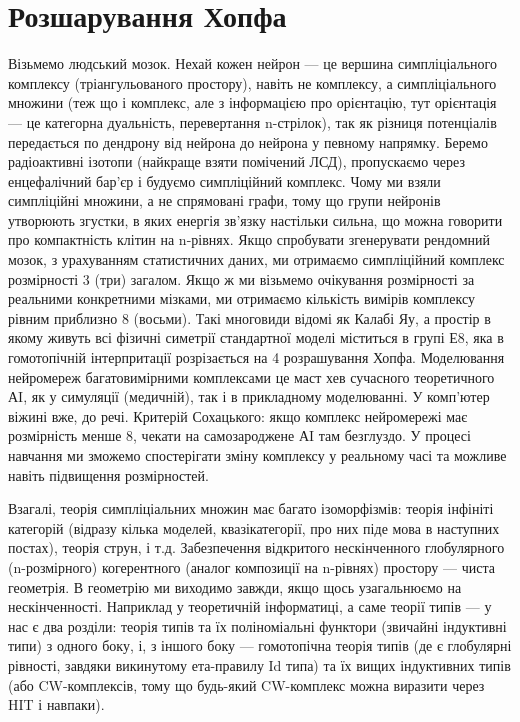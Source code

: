 \section{Розшарування Хопфа}

Візьмемо людський мозок. Нехай кожен нейрон --- це вершина симпліціального
комплексу (тріангульованого простору), навіть не комплексу, а симпліціального
множини (теж що і комплекс, але з інформацією про орієнтацію, тут орієнтація ---
це категорна дуальність, перевертання n-стрілок), так як різниця потенціалів
передається по дендрону від нейрона до нейрона у певному напрямку. Беремо
радіоактивні ізотопи (найкраще взяти помічений ЛСД), пропускаємо через
енцефалічний бар'єр і будуємо симпліційний комплекс. Чому ми взяли симпліційні
множини, а не спрямовані графи, тому що групи нейронів утворюють згустки,
в яких енергія зв'язку настільки сильна, що можна говорити про компактність
клітин на n-рівнях. Якщо спробувати згенерувати рендомний мозок, з урахуванням
статистичних даних, ми отримаємо симпліційний комплекс розмірності 3 (три) загалом.
Якщо ж ми візьмемо очікування розмірності за реальними конкретними мізками,
ми отримаємо кількість вимірів комплексу рівним приблизно 8 (восьми). Такі
многовиди відомі як Калабі Яу, а простір в якому живуть всі фізичні симетрії
стандартної моделі міститься в групі Е8, яка в гомотопічній інтерпритації
розрізається на 4 розрашування Хопфа. Моделювання нейромереж багатовимірними
комплексами це маст хев сучасного теоретичного АI, як у симуляції (медичній),
так і в прикладному моделюванні. У комп'ютер віжині вже, до речі. Критерій
Сохацького: якщо комплекс нейромережі має розмірність менше 8, чекати на
самозароджене АI там безглуздо. У процесі навчання ми зможемо спостерігати
зміну комплексу у реальному часі та можливе навіть підвищення розмірностей.

Взагалі, теорія симпліціальних множин має багато ізоморфізмів: теорія інфініті
категорій (відразу кілька моделей, квазікатегорії, про них піде мова в наступних
постах), теорія струн, і т.д. Забезпечення відкритого нескінченного
глобулярного (n-розмірного) когерентного (аналог композиції на n-рівнях)
простору --- чиста геометрія. В геометрію ми виходимо завжди, якщо щось узагальнюємо
на нескінченності. Наприклад у теоретичній інформатиці, а саме теорії типів ---
у нас є два розділи: теорія типів та їх поліноміальні функтори (звичайні індуктивні
типи) з одного боку, і, з іншого боку --- гомотопічна теорія типів (де є глобулярні
рівності, завдяки викинутому ета-правилу Id типа) та їх вищих індуктивних
типів (або CW-комплексів, тому що будь-який CW-комплекс можна виразити через HIT і навпаки).
